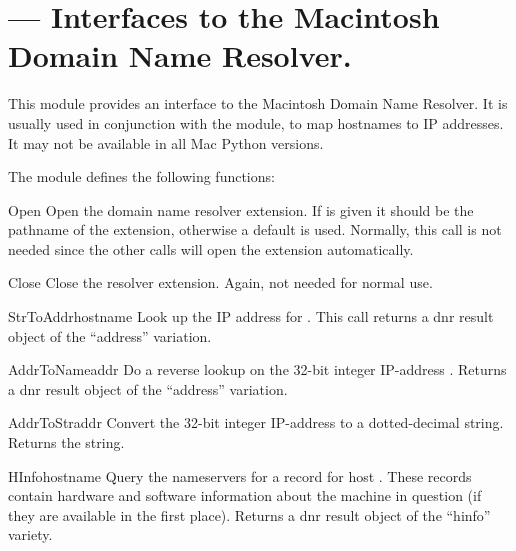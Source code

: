 \section{ ---
         Interfaces to the Macintosh Domain Name Resolver.}



This module provides an interface to the Macintosh Domain Name
Resolver.  It is usually used in conjunction with the 
module, to map hostnames to IP addresses.  It may not be available in
all Mac Python versions.

The  module defines the following functions:


\begin{funcdesc}{Open}{}
Open the domain name resolver extension.  If  is given it
should be the pathname of the extension, otherwise a default is
used.  Normally, this call is not needed since the other calls will
open the extension automatically.
\end{funcdesc}

\begin{funcdesc}{Close}{}
Close the resolver extension.  Again, not needed for normal use.
\end{funcdesc}

\begin{funcdesc}{StrToAddr}{hostname}
Look up the IP address for .  This call returns a dnr
result object of the ``address'' variation.
\end{funcdesc}

\begin{funcdesc}{AddrToName}{addr}
Do a reverse lookup on the 32-bit integer IP-address
.  Returns a dnr result object of the ``address'' variation.
\end{funcdesc}

\begin{funcdesc}{AddrToStr}{addr}
Convert the 32-bit integer IP-address  to a dotted-decimal
string.  Returns the string.
\end{funcdesc}

\begin{funcdesc}{HInfo}{hostname}
Query the nameservers for a  record for host
.  These records contain hardware and software
information about the machine in question (if they are available in
the first place).  Returns a dnr result object of the ``hinfo''
variety.
\end{funcdesc}

